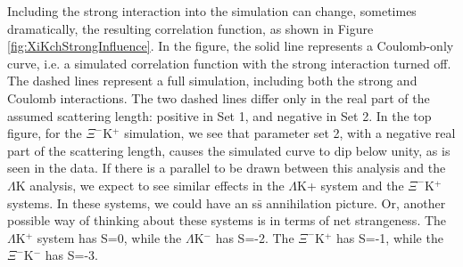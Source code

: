 \documentclass[../AnalysisNoteJBuxton.tex]{subfiles}
\begin{document}
Including the strong interaction into the simulation can change, sometimes dramatically, the resulting correlation function, as shown in Figure \ref{fig:XiKchStrongInfluence}.  In the figure, the solid line represents a Coulomb-only curve, i.e. a simulated correlation function with the strong interaction turned off.  The dashed lines represent a full simulation, including both the strong and Coulomb interactions.  The two dashed lines differ only in the real part of the assumed scattering length: positive in Set 1, and negative in Set 2.  In the top figure, for the $\Xi^{-}$K$^{+}$ simulation, we see that parameter set 2, with a negative real part of the scattering length, causes the simulated curve to dip below unity, as is seen in the data.  If there is a parallel to be drawn between this analysis and the $\Lambda$K analysis, we expect to see similar effects in the $\Lambda$K+ system and the $\Xi^{-}$K$^{+}$ systems.  In these systems, we could have an s$\bar{\mathrm{s}}$ annihilation picture.  Or, another possible way of thinking about these systems is in terms of net strangeness.  The $\Lambda$K$^{+}$ system has S=0, while the $\Lambda$K$^{-}$ has S=-2.  The $\Xi^{-}$K$^{+}$ has S=-1, while the $\Xi^{-}$K$^{-}$ has S=-3.
\end{document}
